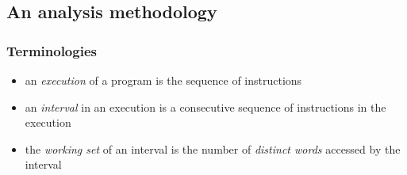 \documentclass[12pt,dvipdfmx]{beamer}
\newcommand{\ao}[1]{{\color{blue}#1}}
\begin{document}
\subsection{An analysis methodology}


\begin{frame}
\frametitle{Terminologies}

\begin{itemize}
\item<1-> an \ao{\emph{execution}} of a program is the sequence of
  instructions 
\item<3-> an \ao{\emph{interval}} in an execution is a consecutive
  sequence of instructions in the execution
\item<4-> the \ao{\emph{working set}} of an interval is the
  number of \ao{\emph{distinct words}} accessed by the interval
\end{itemize}

\begin{center}
%
%
%
%
\end{center}
\end{frame}
\end{document}
